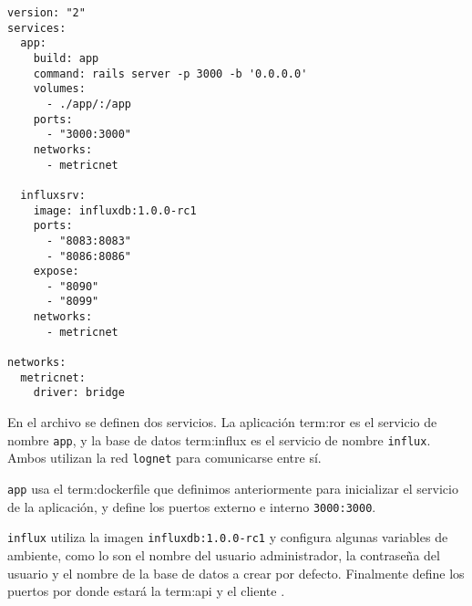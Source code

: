 \begin{lstlisting}
version: "2"
services:
  app:
    build: app
    command: rails server -p 3000 -b '0.0.0.0'
    volumes:
      - ./app/:/app
    ports:
      - "3000:3000"
    networks:
      - metricnet

  influxsrv:
    image: influxdb:1.0.0-rc1
    ports:
      - "8083:8083"
      - "8086:8086"
    expose:
      - "8090"
      - "8099"
    networks:
      - metricnet

networks:
  metricnet:
    driver: bridge
\end{lstlisting}

En el archivo se definen dos servicios. La aplicación \gls{term:ror} es el
servicio de nombre \lstinline{app}, y la base de datos \gls{term:influx} es el
servicio de nombre \lstinline{influx}. Ambos utilizan la red \lstinline{lognet}
para comunicarse entre sí.

\lstinline{app} usa el \gls{term:dockerfile} que definimos anteriormente para
inicializar el servicio de la aplicación, y define los puertos externo e interno
\lstinline{3000:3000}.

\lstinline{influx} utiliza la imagen \lstinline{influxdb:1.0.0-rc1} y configura
algunas variables de ambiente, como lo son el nombre del usuario administrador,
la contraseña del usuario y el nombre de la base de datos a crear por defecto.
Finalmente define los puertos por donde estará la \gls{term:api} y el cliente
.
